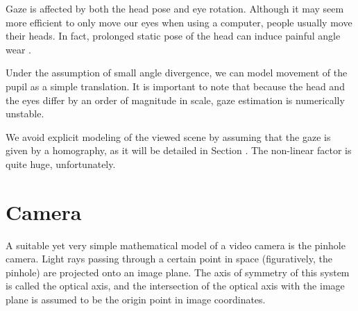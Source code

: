 Gaze is affected by both the head pose and eye rotation.
Although it may seem more efficient to only move our eyes when using a computer, people usually move their heads.
In fact, prolonged static pose of the head can induce painful angle wear .


Under the assumption of small angle divergence, we can model movement of the pupil as a simple translation.
It is important to note that because the head and the eyes differ by an order of magnitude in scale, gaze estimation is numerically unstable.

We avoid explicit modeling of the viewed scene by assuming that the gaze is given by a homography, as it will be detailed in Section .
The non-linear factor is quite huge, unfortunately.

\section{Camera}

A suitable yet very simple mathematical model of a video camera is the pinhole camera.
Light rays passing through a certain point in space (figuratively, the pinhole) are projected onto an image plane.
The axis of symmetry of this system is called the optical axis, and the intersection of the optical axis with the image plane is assumed to be the origin point in image coordinates.

